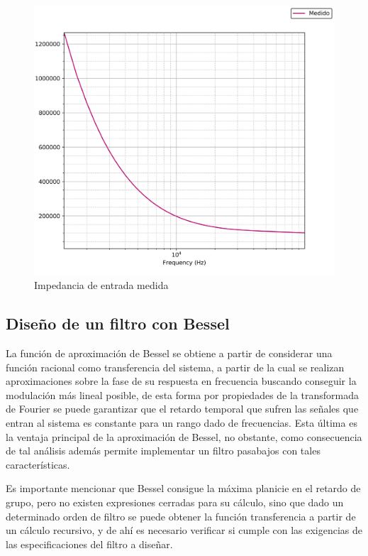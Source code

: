 \begin{figure}[H]
    \centering
    \includegraphics[scale=0.7]{../EJ1/Recursos/legendre_impedancia_entrada.png}
    \caption{Impedancia de entrada medida}
    \label{fig:legendre_impedancia_entrada}
\end{figure}

\subsection{Dise\~no de un filtro con Bessel}
La funci\'on de aproximaci\'on de Bessel se obtiene a partir de considerar una funci\'on racional como transferencia del sistema, a partir de la cual se realizan aproximaciones sobre la fase de su respuesta en frecuencia
buscando conseguir la modulaci\'on m\'as lineal posible, de esta forma por propiedades de la transformada de Fourier se puede garantizar que el retardo temporal que sufren las se\~nales que entran al sistema es constante
para un rango dado de frecuencias. Esta \'ultima es la ventaja principal de la aproximaci\'on de Bessel, no obstante, como consecuencia de tal an\'alisis adem\'as permite implementar un filtro pasabajos con tales caracter\'isticas.

Es importante mencionar que Bessel consigue la m\'axima planicie en el retardo de grupo, pero no existen expresiones cerradas para su c\'alculo, sino que dado un determinado orden de filtro se puede obtener la funci\'on transferencia
a partir de un c\'alculo recursivo, y de ah\'i es necesario verificar si cumple con las exigencias de las especificaciones del filtro a dise\~nar.

